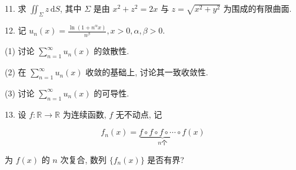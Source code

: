 \documentclass{examcollection}
\renewcommand{\displayformula}[1]{\[#1\]}
\begin{document}
{\begin{minipage}{\textwidth}
11. 求 $\iint_{\Sigma} z \, \mathrm{d}S$, 其中 $\Sigma$ 是由 $x^{2} + z^{2} = 2x$ 与 $z = \sqrt{x^{2} + y^{2}}$ 为围成的有限曲面.\par
12. 记 $u_{n}(x) = \frac{\ln(1 + n^{\alpha}x)}{n^{\beta}}, x > 0, \alpha, \beta > 0.$\par
(1) 讨论 $\sum_{n=1}^{\infty} u_n(x)$ 的敛散性.\par
(2) 在 $\sum_{n=1}^{\infty} u_n(x)$ 收敛的基础上, 讨论其一致收敛性.\par
(3) 讨论 $\sum_{n=1}^{\infty} u_n(x)$ 的可导性.\par
13. 设 $f: \mathbb{R} \to \mathbb{R}$ 为连续函数, $f$ 无不动点, 记\par
\displayformula{f _ {n} (x) = \underbrace {f \circ f \circ f \circ \cdots \circ f} _ {n \text {个}} (x)}\par
为 $f(x)$ 的 $n$ 次复合, 数列 $\{f_n(x)\}$ 是否有界?\par
\end{minipage}}
\ifdim\dimexpr\ht\proofbox+\dp\proofbox\relax>\textheight
\noindent\resizebox{!}{\textheight}{\usebox{\proofbox}}\else\noindent\usebox{\proofbox}\fi\clearpage
\end{document}
